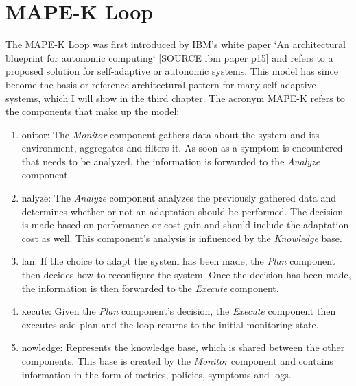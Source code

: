     \section{MAPE-K Loop}
    The MAPE-K Loop was first introduced by IBM's white paper `An architectural blueprint for autonomic computing` [SOURCE ibm paper p15]
    and refers to a proposed solution for self-adaptive or autonomic systems.
    This model has since become the basis or reference architectural pattern for many self adaptive systems, which I will show in the third chapter.
    The acronym MAPE-K refers to the components that make up the model:
    \begin{enumerate}
        \item {}onitor: 
            The \textit{Monitor} component gathers data about the system and its environment, aggregates and filters it.
            As soon as a symptom is encountered that needs to be analyzed, the information is forwarded to the \textit{Analyze} component.
        \item {}nalyze: 
            The \textit{Analyze} component analyzes the previously gathered data and determines whether or not an adaptation should be performed.
            The decision is made based on performance or cost gain and should include the adaptation cost as well.
            This component's analysis is influenced by the \textit{Knowledge} base.
        \item {}lan: 
            If the choice to adapt the system has been made, the \textit{Plan} component then decides how to reconfigure the system.
            Once the decision has been made, the information is then forwarded to the \textit{Execute} component.
        \item {}xecute: 
            Given the \textit{Plan} component's decision, the \textit{Execute} component then executes said plan and the loop returns to the initial monitoring state.
        \item {}nowledge: 
            Represents the knowledge base, which is shared between the other components.
            This base is created by the \textit{Monitor} component and contains information in the form of metrics, policies, symptoms and logs.
    \end{enumerate}
    



